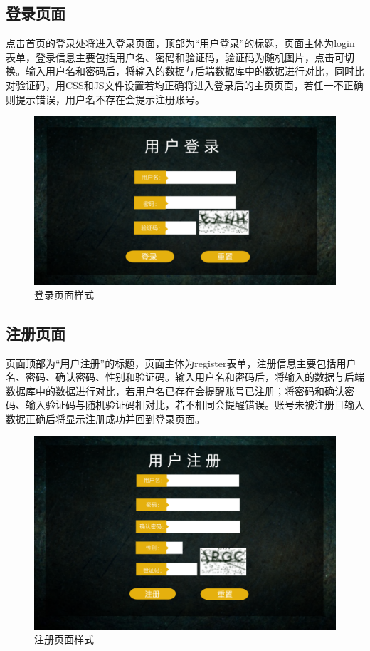 \documentclass{ctexart}
\begin{document}
\subsection{登录页面}
点击首页的登录处将进入登录页面，顶部为“用户登录”的标题，页面主体为login表单，登录信息主要包括用户名、密码和验证码，验证码为随机图片，点击可切换。输入用户名和密码后，将输入的数据与后端数据库中的数据进行对比，同时比对验证码，用CSS和JS文件设置若均正确将进入登录后的主页页面，若任一不正确则提示错误，用户名不存在会提示注册账号。
\begin {figure}[h]
\centering %
\includegraphics[width=\textwidth]{p2.png}
\caption{登录页面样式} %
\label{five}
\end {figure}

\subsection{注册页面}
页面顶部为“用户注册”的标题，页面主体为register表单，注册信息主要包括用户名、密码、确认密码、性别和验证码。输入用户名和密码后，将输入的数据与后端数据库中的数据进行对比，若用户名已存在会提醒账号已注册；将密码和确认密码、输入验证码与随机验证码相对比，若不相同会提醒错误。账号未被注册且输入数据正确后将显示注册成功并回到登录页面。
\begin {figure}[h]
\centering %
\includegraphics[width=\textwidth]{p3.png}
\caption{注册页面样式} %
\label{five}
\end {figure}
\end{document}
